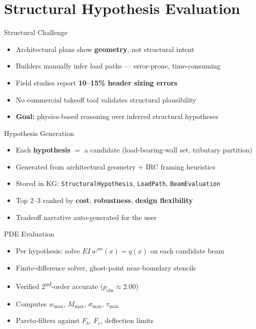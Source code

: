 \documentclass[11pt,aspectratio=169]{beamer}
\begin{document}
\section{Structural Hypothesis Evaluation}

\begin{frame}{Structural Challenge}
\begin{itemize}
  \item Architectural plans show \textbf{geometry}, not structural intent
  \item Builders manually infer load paths --- error-prone, time-consuming
  \item Field studies report \textbf{10--15\% header sizing errors}
  \item No commercial takeoff tool validates structural plausibility
  \item \textbf{Goal:} physics-based reasoning over inferred structural hypotheses
\end{itemize}
\end{frame}

\begin{frame}{Hypothesis Generation}
\begin{itemize}
  \item Each \textbf{hypothesis} $=$ a candidate (load-bearing-wall set, tributary partition)
  \item Generated from architectural geometry $+$ IRC framing heuristics
  \item Stored in KG: \texttt{StructuralHypothesis}, \texttt{LoadPath}, \texttt{BeamEvaluation}
  \item Top 2--3 ranked by \textbf{cost}, \textbf{robustness}, \textbf{design flexibility}
  \item Tradeoff narrative auto-generated for the user
\end{itemize}
\end{frame}

\begin{frame}{PDE Evaluation}
\begin{itemize}
  \item Per hypothesis: solve $EI\,w''''(x) = q(x)$ on each candidate beam
  \item Finite-difference solver, ghost-point near-boundary stencils
  \item Verified 2\textsuperscript{nd}-order accurate ($p_{\text{obs}} \approx 2.00$)
  \item Computes $w_{\max}$, $M_{\max}$, $\sigma_{\max}$, $\tau_{\max}$
  \item Pareto-filters against $F_b$, $F_v$, deflection limits
\end{itemize}
\end{frame}
\end{document}
